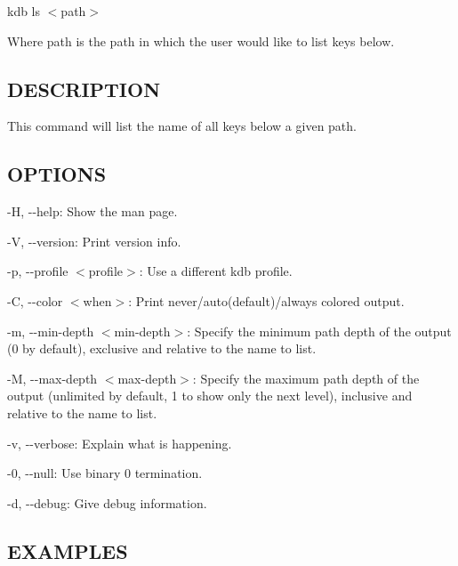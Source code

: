 {\ttfamily kdb ls $<$path$>$}

Where {\ttfamily path} is the path in which the user would like to list keys below.

\subsection*{D\+E\+S\+C\+R\+I\+P\+T\+I\+ON}

This command will list the name of all keys below a given path.

\subsection*{O\+P\+T\+I\+O\+NS}


\begin{DoxyItemize}
\item {\ttfamily -\/H}, {\ttfamily -\/-\/help}\+: Show the man page.
\item {\ttfamily -\/V}, {\ttfamily -\/-\/version}\+: Print version info.
\item {\ttfamily -\/p}, {\ttfamily -\/-\/profile $<$profile$>$}\+: Use a different kdb profile.
\item {\ttfamily -\/C}, {\ttfamily -\/-\/color $<$when$>$}\+: Print never/auto(default)/always colored output.
\item {\ttfamily -\/m}, {\ttfamily -\/-\/min-\/depth $<$min-\/depth$>$}\+: Specify the minimum path depth of the output (0 by default), exclusive and relative to the name to list.
\item {\ttfamily -\/M}, {\ttfamily -\/-\/max-\/depth $<$max-\/depth$>$}\+: Specify the maximum path depth of the output (unlimited by default, 1 to show only the next level), inclusive and relative to the name to list.
\item {\ttfamily -\/v}, {\ttfamily -\/-\/verbose}\+: Explain what is happening.
\item {\ttfamily -\/0}, {\ttfamily -\/-\/null}\+: Use binary 0 termination.
\item {\ttfamily -\/d}, {\ttfamily -\/-\/debug}\+: Give debug information.
\end{DoxyItemize}

\subsection*{E\+X\+A\+M\+P\+L\+ES}


